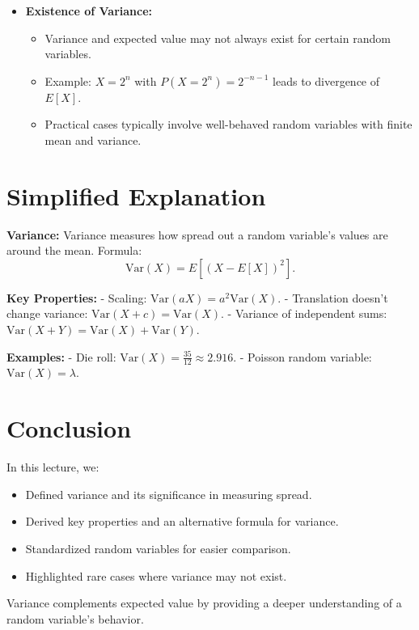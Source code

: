 \documentclass{article}
\begin{document}
\begin{itemize}
  \item \textbf{Existence of Variance:}
    \begin{itemize}
      \item Variance and expected value may not always exist for certain random variables.
      \item Example: $X = 2^n$ with $P(X = 2^n) = 2^{-n-1}$ leads to divergence of $E[X]$.
      \item Practical cases typically involve well-behaved random variables with finite mean and variance.
    \end{itemize}
\end{itemize}

\section*{Simplified Explanation}

\textbf{Variance:}
Variance measures how spread out a random variable's values are around the mean.
Formula:
\[
  \text{Var}(X) = E[(X - E[X])^2].
\]

\textbf{Key Properties:}
- Scaling: $\text{Var}(aX) = a^2 \text{Var}(X)$.
- Translation doesn't change variance: $\text{Var}(X + c) = \text{Var}(X)$.
- Variance of independent sums: $\text{Var}(X + Y) = \text{Var}(X) + \text{Var}(Y)$.

\textbf{Examples:}
- Die roll: $\text{Var}(X) = \frac{35}{12} \approx 2.916$.
- Poisson random variable: $\text{Var}(X) = \lambda$.

\section*{Conclusion}

In this lecture, we:
\begin{itemize}
  \item Defined variance and its significance in measuring spread.
  \item Derived key properties and an alternative formula for variance.
  \item Standardized random variables for easier comparison.
  \item Highlighted rare cases where variance may not exist.
\end{itemize}

Variance complements expected value by providing a deeper understanding of a random variable's behavior.
\end{document}
